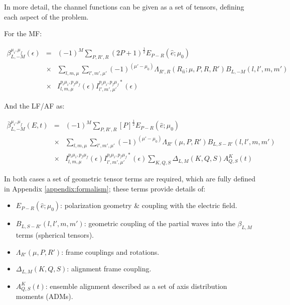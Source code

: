 \documentclass[10pt]{article}
\begin{document}
In more detail, the channel functions can be given as a set of tensors, defining each aspect of the problem.

For the MF:

\begin{eqnarray}
\beta_{L,-M}^{\mu_{i},\mu_{f}}(\epsilon) & = & (-1)^{M}\sum_{P,R',R}(2P+1)^{\frac{1}{2}}{E_{P-R}(\hat{e};\mu_{0})}\\
 & \times &\sum_{l,m,\mu}\sum_{l',m',\mu'}(-1)^{(\mu'-\mu_{0})}{\Lambda_{R',R}(R_{\hat{n}};\mu,P,R,R')B_{L,-M}(l,l',m,m')}\\
 & \times & I_{l,m,\mu}^{p_{i}\mu_{i},p_{f}\mu_{f}}(\epsilon)I_{l',m',\mu'}^{p_{i}\mu_{i},p_{f}\mu_{f}*}(\epsilon)\label{eq:BLM-tensor-MF}
\end{eqnarray}

And the LF/AF as:

\begin{eqnarray}
\bar{\beta}_{L,-M}^{\mu_{i},\mu_{f}}(E,t) & = & (-1)^{M}\sum_{P,R',R}{[P]^{\frac{1}{2}}}{E_{P-R}(\hat{e};\mu_{0})}\\
 & \times &\sum_{l,m,\mu}\sum_{l',m',\mu'}(-1)^{(\mu'-\mu_{0})}{\Lambda_{R'}(\mu,P,R')B_{L,S-R'}(l,l',m,m')}\\
 & \times &I_{l,m,\mu}^{p_{i}\mu_{i},p_{f}\mu_{f}}(\epsilon)I_{l',m',\mu'}^{p_{i}\mu_{i},p_{f}\mu_{f}*}(\epsilon)\sum_{K,Q,S}\Delta_{L,M}(K,Q,S)A_{Q,S}^{K}(t)\label{eq:BLM-tensor-AF}
\end{eqnarray}

In both cases a set of geometric tensor terms are required, which are fully defined in Appendix \ref{appendix:formalism}; these terms provide details of:

\begin{itemize}
\item ${E_{P-R}(\hat{e};\mu_{0})}$: polarization geometry \& coupling with the electric field.
\item $B_{L,S-R'}(l,l',m,m')$: geometric coupling of the partial waves into the $\beta_{L,M}$ terms (spherical tensors).
\item $\Lambda_{R'}(\mu,P,R')$: frame couplings and rotations.
\item $\Delta_{L,M}(K,Q,S)$: alignment frame coupling.
\item $A_{Q,S}^{K}(t)$: ensemble alignment described as a set of axis distribution moments (ADMs).
\end{itemize}
\end{document}
